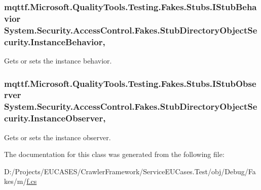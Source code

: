 \hypertarget{class_system_1_1_security_1_1_access_control_1_1_fakes_1_1_stub_directory_object_security_a2362a001f6a3906438dc2164e6ce5faa}{
\subsubsection[{Instance\-Behavior}]{\setlength{\rightskip}{0pt plus 5cm}mqttf.\-Microsoft.\-Quality\-Tools.\-Testing.\-Fakes.\-Stubs.\-I\-Stub\-Behavior System.\-Security.\-Access\-Control.\-Fakes.\-Stub\-Directory\-Object\-Security.\-Instance\-Behavior\hspace{0.3cm}{\ttfamily [get]}, {\ttfamily [set]}}}\label{class_system_1_1_security_1_1_access_control_1_1_fakes_1_1_stub_directory_object_security_a2362a001f6a3906438dc2164e6ce5faa}


Gets or sets the instance behavior.

\hypertarget{class_system_1_1_security_1_1_access_control_1_1_fakes_1_1_stub_directory_object_security_a997282f670a9f8cde16a5fb02ade0dd3}{
\subsubsection[{Instance\-Observer}]{\setlength{\rightskip}{0pt plus 5cm}mqttf.\-Microsoft.\-Quality\-Tools.\-Testing.\-Fakes.\-Stubs.\-I\-Stub\-Observer System.\-Security.\-Access\-Control.\-Fakes.\-Stub\-Directory\-Object\-Security.\-Instance\-Observer\hspace{0.3cm}{\ttfamily [get]}, {\ttfamily [set]}}}\label{class_system_1_1_security_1_1_access_control_1_1_fakes_1_1_stub_directory_object_security_a997282f670a9f8cde16a5fb02ade0dd3}


Gets or sets the instance observer.



The documentation for this class was generated from the following file\-:\begin{DoxyCompactItemize}
\item 
D\-:/\-Projects/\-E\-U\-C\-A\-S\-E\-S/\-Crawler\-Framework/\-Service\-E\-U\-Cases.\-Test/obj/\-Debug/\-Fakes/m/\hyperlink{m_2f_8cs}{f.\-cs}\end{DoxyCompactItemize}
